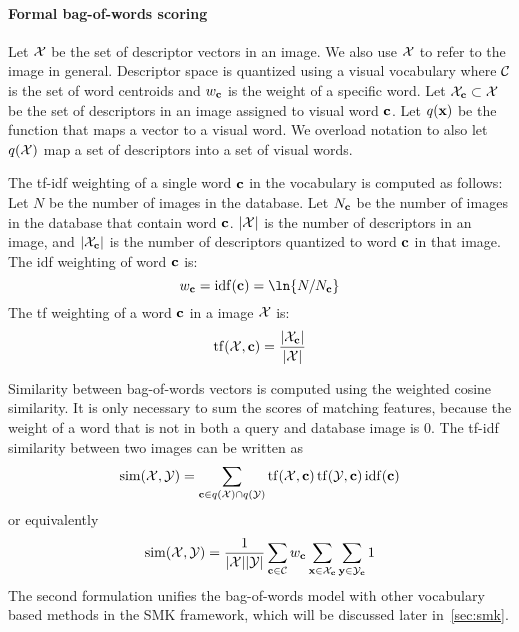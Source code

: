         \paragraph{Formal bag-of-words scoring}
            Let $\mathcal{X}$ be the set of descriptor vectors in an image.
            We also use $\mathcal{X}$ to refer to the image in general.
            Descriptor space is quantized using a visual vocabulary where $\mathcal{C}$
              is the set of word centroids and $w_{\mathbf{c}}$ is the weight of a
              specific word.
            Let $\mathcal{X}_{\mathbf{c}} \subset \mathcal{X}$ be the set of descriptors in an image
              assigned to visual word $\mathbf{c}$.
            Let $q(\mathbf{x})$ be the function that maps a vector to a visual word.
            We overload notation to also let $q(\mathcal{X})$ map a set of descriptors
              into a set of visual words.

            The tf-idf weighting of a single word $\mathbf{c}$ in the
              vocabulary is computed as follows:
            Let $N$ be the number of images in the database.
            Let $N_{\mathbf{c}}$ be the number of images in the database that
              contain word $\mathbf{c}$.
            $|\mathcal{X}|$ is the number of descriptors in an image, and
              $|\mathcal{X}_{\mathbf{c}}|$ is the number of descriptors quantized to
              word $\mathbf{c}$ in that image.
            The idf weighting of word $\mathbf{c}$ is:
            \begin{equation}
                w_\c = \opname{idf}(\c) = \ln{N/N_\c}
            \end{equation}
            The tf weighting of a word $\mathbf{c}$ in a image $\mathcal{X}$ is:
            \begin{equation}
                \operatorname{tf}(\mathcal{X}, \mathbf{c}) = \frac{|\mathcal{X}_{\mathbf{c}}|}{|\mathcal{X}|}
            \end{equation}

            Similarity between bag-of-words vectors is computed using
              the weighted cosine similarity.
            It is only necessary to sum the scores of matching
              features, because the weight of a word that is not in both
              a query and database image is $0$.
            The tf-idf similarity between two images can be written as
            \begin{equation}
                \operatorname{sim}(\mathcal{X}, \mathcal{Y}) = \sum_{\mathbf{c} \in q(\mathcal{X}) \cap q(\mathcal{Y})} \operatorname{tf}(\mathcal{X}, \mathbf{c}) \operatorname{tf}(\mathcal{Y}, \mathbf{c}) \operatorname{idf}(\mathbf{c}) 
            \end{equation}
            or equivalently
            \begin{equation}
                \operatorname{sim}(\mathcal{X}, \mathcal{Y}) = \frac{1}{|\mathcal{X}||\mathcal{Y}|}\sum_{\mathbf{c} \in \mathcal{C}} w_{\mathbf{c}} \sum_{\mathbf{x} \in \mathcal{X}_{\mathbf{c}}} \sum_{\mathbf{y} \in \mathcal{Y}_{\mathbf{c}}} 1
            \end{equation}
            The second formulation unifies the bag-of-words model with
              other vocabulary based methods in the SMK framework, which
              will be discussed later in~\cref{sec:smk}.

